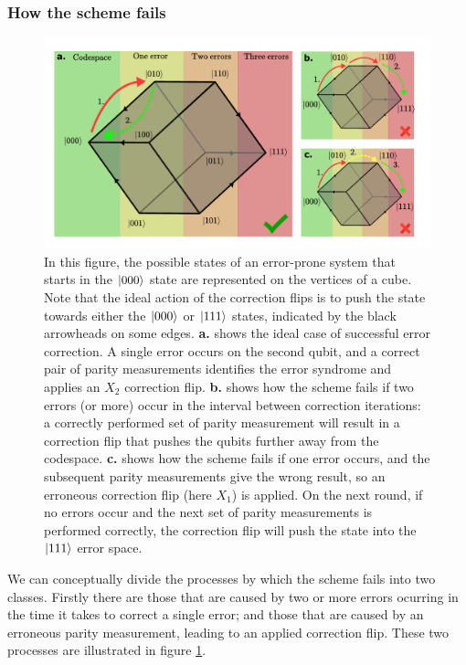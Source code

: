 \documentclass{report}
\begin{document}
\subsubsection{How the scheme fails}
\begin{figure}[ht]
    \centering
    \includegraphics[scale = 0.85]{Figures/cubediagram.pdf}
    \caption{In this figure, the possible states of an error-prone system that starts in the $\ket{000}$ state are represented on the vertices of a cube. Note that the ideal action of the correction flips is to push the state towards either the $\ket{000}$ or $\ket{111}$ states, indicated by the black arrowheads on some edges. \textbf{a.} shows the ideal case of successful error correction. A single error occurs on the second qubit, and a correct pair of parity measurements identifies the error syndrome and applies an $X_2$ correction flip. \textbf{b.} shows how the scheme fails if two errors (or more) occur in the interval between correction iterations: a correctly performed set of parity measurement will result in a correction flip that pushes the qubits further away from the codespace. \textbf{c.} shows how the scheme fails if one error occurs, and the subsequent parity measurements give the wrong result, so an erroneous correction flip (here $X_1$) is applied. On the next round, if no errors occur and the next set of parity measurements is performed correctly, the correction flip will push the state into the $\ket{111}$ error space.}
    \label{fig:cubediagram}
\end{figure}
We can conceptually divide the processes by which the scheme fails into two classes. Firstly there are those that are caused by two or more errors ocurring in the time it takes to correct a single error; and those that are caused by an erroneous parity measurement, leading to an applied correction flip. These two processes are illustrated in figure \ref{fig:cubediagram}.
\end{document}
